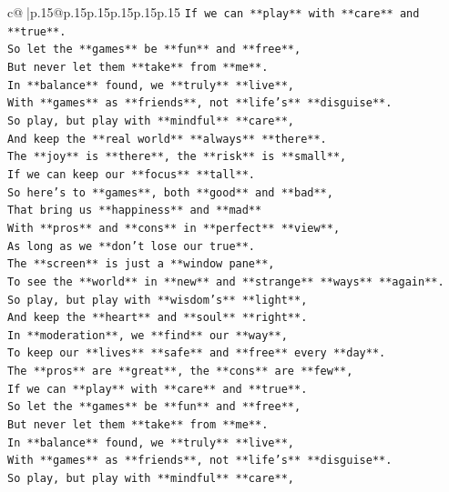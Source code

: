 \documentclass{article}
\begin{document}
{\begin{supertabular}{c@{$\;$}|p{.15\linewidth}@{}p{.15\linewidth}p{.15\linewidth}p{.15\linewidth}p{.15\linewidth}p{.15\linewidth}}
{{{\texttt{If we can **play** with **care** and **true**.} \\
\texttt{So let the **games** be **fun** and **free**,} \\
\texttt{But never let them **take** from **me**.} \\
\texttt{In **balance** found, we **truly** **live**,} \\
\texttt{With **games** as **friends**, not **life's** **disguise**.} \\
\texttt{So play, but play with **mindful** **care**,} \\
\texttt{And keep the **real world** **always** **there**.} \\
\texttt{The **joy** is **there**, the **risk** is **small**,} \\
\texttt{If we can keep our **focus** **tall**.} \\
\texttt{So here's to **games**, both **good** and **bad**,} \\
\texttt{That bring us **happiness** and **mad**} \\
\texttt{With **pros** and **cons** in **perfect** **view**,} \\
\texttt{As long as we **don't lose our true**.} \\
\texttt{The **screen** is just a **window pane**,} \\
\texttt{To see the **world** in **new** and **strange** **ways** **again**.} \\
\texttt{So play, but play with **wisdom's** **light**,} \\
\texttt{And keep the **heart** and **soul** **right**.} \\
\texttt{In **moderation**, we **find** our **way**,} \\
\texttt{To keep our **lives** **safe** and **free** every **day**.} \\
\texttt{The **pros** are **great**, the **cons** are **few**,} \\
\texttt{If we can **play** with **care** and **true**.} \\
\texttt{So let the **games** be **fun** and **free**,} \\
\texttt{But never let them **take** from **me**.} \\
\texttt{In **balance** found, we **truly** **live**,} \\
\texttt{With **games** as **friends**, not **life's** **disguise**.} \\
\texttt{So play, but play with **mindful** **care**,} \\
}}}
\end{supertabular}}
\end{document}
